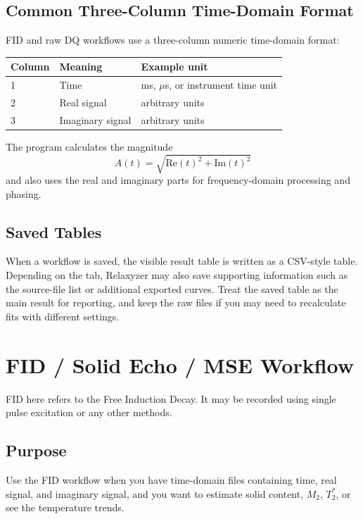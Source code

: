 \documentclass[11pt,a4paper]{article}
\newcommand{\Relaxyzer}{Relaxyzer}
\newcommand{\TtwoStar}{\ensuremath{T_2^{\ast}}}
\newcommand{\Mtwo}{\ensuremath{M_2}}
\begin{document}
\subsection{Common Three-Column Time-Domain Format}
FID and raw DQ workflows use a three-column numeric time-domain format:
\begin{center}
\begin{tabular}{lll}
\toprule
Column & Meaning & Example unit \\
\midrule
1 & Time & ms, \(\mu\)s, or instrument time unit \\
2 & Real signal & arbitrary units \\
3 & Imaginary signal & arbitrary units \\
\bottomrule
\end{tabular}
\end{center}
The program calculates the magnitude
\begin{equation}
A(t)=\sqrt{\mathrm{Re}(t)^2+\mathrm{Im}(t)^2}
\end{equation}
and also uses the real and imaginary parts for frequency-domain processing and phasing.

\subsection{Saved Tables}
When a workflow is saved, the visible result table is written as a CSV-style table. Depending on the tab, \Relaxyzer{} may also save supporting information such as the source-file list or additional exported curves. Treat the saved table as the main result for reporting, and keep the raw files if you may need to recalculate fits with different settings.

\section{FID / Solid Echo / MSE Workflow}

FID here refers to the Free Induction Decay. It may be recorded using single pulse excitation or any other methods.

\subsection{Purpose}
Use the FID workflow when you have time-domain files containing time, real signal, and imaginary signal, and you want to estimate solid content, \Mtwo{}, \TtwoStar{}, or see the temperature trends.
\end{document}
